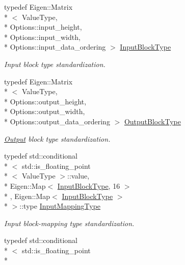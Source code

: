 \begin{DoxyCompactItemize}
\item 
typedef Eigen\-::\-Matrix\\*
$<$ Value\-Type, \\*
Options\-::input\-\_\-height, \\*
Options\-::input\-\_\-width, \\*
Options\-::input\-\_\-data\-\_\-ordering $>$ \hyperlink{structffnn_1_1layer_1_1hidden_1_1extrinsics_af5299a48a27726ba0d407ecb28890092}{Input\-Block\-Type}
\begin{DoxyCompactList}\small\item\em Input block type standardization. \end{DoxyCompactList}\item 
typedef Eigen\-::\-Matrix\\*
$<$ Value\-Type, \\*
Options\-::output\-\_\-height, \\*
Options\-::output\-\_\-width, \\*
Options\-::output\-\_\-data\-\_\-ordering $>$ \hyperlink{structffnn_1_1layer_1_1hidden_1_1extrinsics_ac5ca721e2e5843ddcf90351b59c4e56e}{Output\-Block\-Type}
\begin{DoxyCompactList}\small\item\em \hyperlink{classffnn_1_1layer_1_1_output}{Output} block type standardization. \end{DoxyCompactList}\item 
typedef std\-::conditional\\*
$<$ std\-::is\-\_\-floating\-\_\-point\\*
$<$ Value\-Type $>$\-::value, \\*
Eigen\-::\-Map$<$ \hyperlink{structffnn_1_1layer_1_1hidden_1_1extrinsics_af5299a48a27726ba0d407ecb28890092}{Input\-Block\-Type}, 16 $>$\\*
, Eigen\-::\-Map$<$ \hyperlink{structffnn_1_1layer_1_1hidden_1_1extrinsics_af5299a48a27726ba0d407ecb28890092}{Input\-Block\-Type} $>$\\*
 $>$\-::type \hyperlink{structffnn_1_1layer_1_1hidden_1_1extrinsics_a62256f740b1aaf253c9992d15cda7eab}{Input\-Mapping\-Type}
\begin{DoxyCompactList}\small\item\em Input block-\/mapping type standardization. \end{DoxyCompactList}\item 
typedef std\-::conditional\\*
$<$ std\-::is\-\_\-floating\-\_\-point\\*

\end{DoxyCompactItemize}

